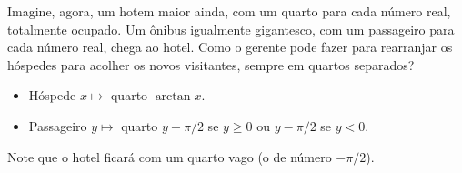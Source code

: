 \begin{exercicio}
	Imagine, agora, um hotem maior ainda, com um quarto para cada número real, totalmente ocupado. Um ônibus igualmente gigantesco, com um passageiro para cada número real, chega ao hotel. Como o gerente pode fazer para rearranjar os hóspedes para acolher os novos visitantes, sempre em quartos separados?
\end{exercicio}
\begin{solucao}
	\begin{itemize}
		\item Hóspede $x\mapsto$ quarto $\arctan x$.
		\item Passageiro $y\mapsto$ quarto $y+\pi/2$ se $y\geq0$ ou $y-\pi/2$ se $y<0$. 
	\end{itemize}
	Note que o hotel ficará com um quarto vago (o de número $-\pi/2$).
\end{solucao}